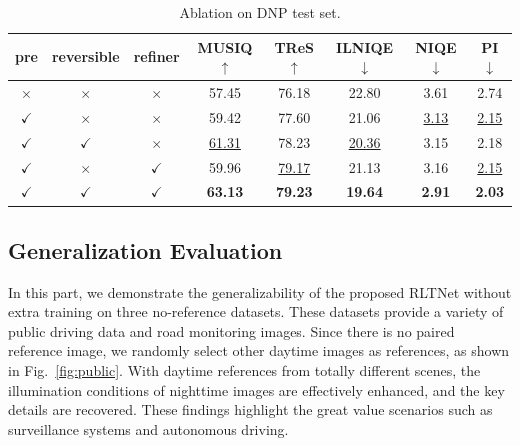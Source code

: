 \documentclass{article}
\begin{document}
\begin{table}[htbp]
\fontsize{8}{8}\selectfont
\setlength{\tabcolsep}{2pt}
\renewcommand{\arraystretch}{1.05}
\caption{Ablation on DNP test set.}
\label{tab:ablation}
\centering
\begin{tabular}{ccc|ccccc}
\hline
\textbf{pre} & \textbf{reversible} & \textbf{refiner} & \textbf{MUSIQ}$\uparrow$ & \textbf{TReS}$\uparrow$ & \textbf{ILNIQE}$\downarrow$ & \textbf{NIQE}$\downarrow$ & \textbf{PI}$\downarrow$ \\
\hline
$\times$       & $\times$       & $\times$       & 57.45             & 76.18             & 22.80             & 3.61             & 2.74             \\
$\checkmark$   & $\times$       & $\times$       & 59.42             & 77.60             & 21.06             & \underline{3.13} & \underline{2.15} \\
$\checkmark$   & $\checkmark$   & $\times$       & \underline{61.31} & 78.23             & \underline{20.36} & 3.15             & 2.18             \\
$\checkmark$   & $\times$       & $\checkmark$   & 59.96             & \underline{79.17} & 21.13             & 3.16             & \underline{2.15} \\
\hline
$\checkmark$   & $\checkmark$   & $\checkmark$   & \textbf{63.13}    & \textbf{79.23}    & \textbf{19.64}    & \textbf{2.91}    & \textbf{2.03}    \\
\hline
\end{tabular}
\end{table}

\subsection{Generalization Evaluation}



In this part, we demonstrate the generalizability of the proposed RLTNet without extra training on three no-reference datasets. These datasets provide a variety of public driving data and road monitoring images. Since there is no paired reference image, we randomly select other daytime images as references, as shown in Fig.~\ref{fig:public}. With daytime references from totally different scenes, the illumination conditions of nighttime images are effectively enhanced, and the key details are recovered. These findings highlight the great value scenarios such as surveillance systems and autonomous driving.
\end{document}
